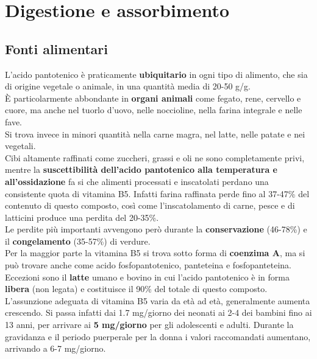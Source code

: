 \documentclass[a4paper, 12pt]{article}
\begin{document}
\section{Digestione e assorbimento}

\subsection{Fonti alimentari}
L’acido pantotenico è praticamente \textbf{ubiquitario} in ogni tipo di alimento, che sia di origine vegetale o animale, in una quantità media di 20-50 {\textmu}g/g.\\
È particolarmente abbondante in \textbf{organi animali} come fegato, rene, cervello e cuore, ma anche nel tuorlo d’uovo, nelle noccioline, nella farina integrale e nelle fave.\\
Si trova invece in minori quantità nella carne magra, nel latte, nelle patate e nei vegetali.\\
Cibi altamente raffinati come zuccheri, grassi e oli ne sono completamente privi, mentre la \textbf{suscettibilità dell’acido pantotenico alla temperatura e all’ossidazione} fa si che alimenti processati  e inscatolati perdano una consistente quota di vitamina B5. Infatti farina raffinata perde fino al 37-47\% del contenuto di questo composto, così come l’inscatolamento di carne, pesce e di latticini produce una perdita del 20-35\%.\\
Le perdite più importanti avvengono però durante la \textbf{conservazione} (46-78\%) e il \textbf{congelamento} (35-57\%) di verdure.\\
Per la maggior parte la vitamina B5 si trova sotto forma di \textbf{coenzima A}, ma si può trovare anche come acido fosfopantotenico, panteteina e fosfopanteteina. Eccezioni sono il \textbf{latte} umano e bovino in cui l’acido pantotenico è in forma \textbf{libera} (non legata) e costituisce il 90\% del totale di questo composto.\\
L’assunzione adeguata di vitamina B5 varia da età ad età, generalmente aumenta crescendo. Si passa infatti dai 1.7 mg/giorno dei neonati ai 2-4 dei bambini fino ai 13 anni, per arrivare ai \textbf{5 mg/giorno} per gli adolescenti e adulti. Durante la gravidanza e il periodo puerperale per la donna i valori raccomandati aumentano, arrivando a 6-7 mg/giorno.
\end{document}
